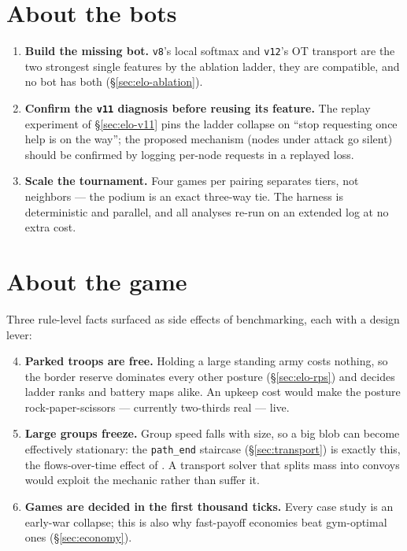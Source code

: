 \documentclass[11pt]{report}
\newcommand{\code}[1]{\texttt{#1}}
\begin{document}
\section*{About the bots}
\begin{enumerate}
  \item \textbf{Build the missing bot.} \code{v8}'s local softmax and
    \code{v12}'s OT transport are the two strongest single features by the
    ablation ladder, they are compatible, and no bot has both
    (\S\ref{sec:elo-ablation}).
  \item \textbf{Confirm the \code{v11} diagnosis before reusing its
    feature.} The replay experiment of \S\ref{sec:elo-v11} pins the ladder
    collapse on ``stop requesting once help is on the way''; the proposed
    mechanism (nodes under attack go silent) should be confirmed by logging
    per-node requests in a replayed loss.
  \item \textbf{Scale the tournament.} Four games per pairing separates
    tiers, not neighbors --- the podium is an exact three-way tie. The
    harness is deterministic and parallel, and all analyses re-run on an
    extended log at no extra cost.
\end{enumerate}

\section*{About the game}
Three rule-level facts surfaced as side effects of benchmarking, each with
a design lever:
\begin{enumerate}
  \setcounter{enumi}{3}
  \item \textbf{Parked troops are free.} Holding a large standing army costs
    nothing, so the border reserve dominates every other posture
    (\S\ref{sec:elo-rps}) and decides ladder ranks and battery maps alike.
    An upkeep cost would make the posture rock-paper-scissors --- currently
    two-thirds real --- live.
  \item \textbf{Large groups freeze.} Group speed falls with size, so a big
    blob can become effectively stationary: the \code{path\_end} staircase
    (\S\ref{sec:transport}) is exactly this, the flows-over-time effect of
    \citet{koehler2002}. A transport solver that splits mass into convoys
    would exploit the mechanic rather than suffer it.
  \item \textbf{Games are decided in the first thousand ticks.} Every case
    study is an early-war collapse; this is also why fast-payoff economies
    beat gym-optimal ones (\S\ref{sec:economy}).
\end{enumerate}
\end{document}
